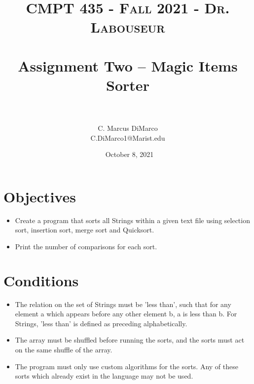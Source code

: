 \documentclass[letterpaper, 10pt]{article}
\title{	
   \normalfont \normalsize 
   \textsc{CMPT 435 - Fall 2021 - Dr. Labouseur} \\[10pt] %
   \horrule{0.5pt} \\[0.25cm] 	%
   \huge Assignment Two -- Magic Items Sorter \\     	    %
   \horrule{0.5pt} \\[0.25cm] 	%
}
\author{C. Marcus DiMarco \\ \normalsize C.DiMarco1@Marist.edu}
\date{\normalsize\ October 8, 2021} 	%
\begin{document}
\maketitle %



\section{Objectives}

\begin{itemize}
    \item \hspace{0.5em}Create a program that sorts all Strings within a given text file using selection sort, insertion sort, merge sort and Quicksort.
    \item \hspace{0.5em}Print the number of comparisons for each sort.
\end{itemize}

\vspace{1.0em}

\section{Conditions}

\begin{itemize}
    \item \hspace{0.5em}The relation on the set of Strings must be 'less than', such that for any element a which appears before any other element b, a is less than b. For Strings, 'less than' is defined as preceding alphabetically.
    \item \hspace{0.5em}The array must be shuffled before running the sorts, and the sorts must act on the same shuffle of the array.
    \item \hspace{0.5em}The program must only use custom algorithms for the sorts. Any of these sorts which already exist in the language may not be used.
\end{itemize}

\vspace{1.0em}
\end{document}
